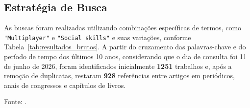 \subsection{Estratégia de Busca}

As buscas foram realizadas utilizando combinações específicas de termos, como \texttt{"Multiplayer"} e \texttt{"Social skills"} e suas variações, conforme Tabela~\ref{tab:resultados_brutos}. A partir do cruzamento das palavras-chave e do período de tempo dos últimos 10 anos, considerando que o dia de consulta foi 11 de junho de 2026, foram identificados inicialmente \textbf{1251} trabalhos e, após a remoção de duplicatas, restaram \textbf{928} referências entre artigos em periódicos, anais de congressos e capítulos de livros.

\begin{table}[htbp]
\centering
\caption{Resultados brutos a partir das bases de dados.}
\label{tab:resultados_brutos}
\vspace{2mm}

\par
\footnotesize Fonte: \cite{Santos2026JogosMultiplayer}.
\end{table}


